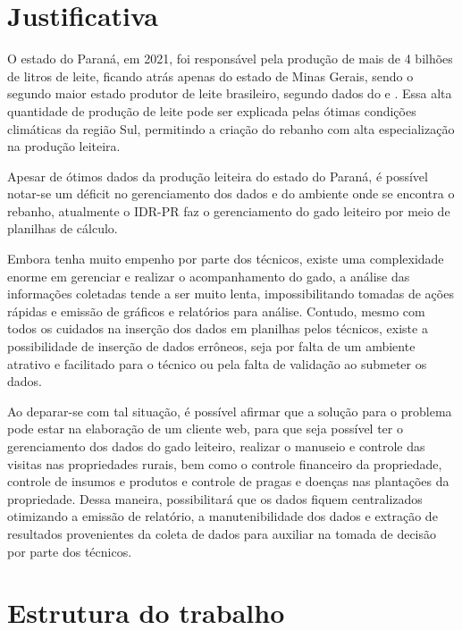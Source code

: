 \section{Justificativa}\label{sec:justificativa}

O estado do Paraná, em 2021, foi responsável pela produção de mais de 4 bilhões de litros de leite, ficando atrás apenas do estado de Minas Gerais, sendo o segundo maior estado produtor de leite brasileiro, segundo dados do  e . Essa alta quantidade de produção de leite pode ser explicada pelas ótimas condições climáticas da região Sul, permitindo a criação do rebanho com alta especialização na produção leiteira.

Apesar de ótimos dados da produção leiteira do estado do Paraná, é possível notar-se um déficit no gerenciamento dos dados e do ambiente onde se encontra o rebanho, atualmente o \gls{IDR-PR} faz o gerenciamento do gado leiteiro por meio de planilhas de cálculo.

Embora tenha muito empenho por parte dos técnicos, existe uma complexidade enorme em gerenciar e realizar o acompanhamento do gado, a análise das informações coletadas tende a ser muito lenta, impossibilitando tomadas de ações rápidas e emissão de gráficos e relatórios para análise. Contudo, mesmo com todos os cuidados na inserção dos dados em planilhas pelos técnicos, existe a possibilidade de inserção de dados errôneos, seja por falta de um ambiente atrativo e facilitado para o técnico ou pela falta de validação ao submeter os dados.

Ao deparar-se com tal situação, é possível afirmar que a solução para o problema pode estar na elaboração de um cliente web, para que seja possível ter o gerenciamento dos dados do gado leiteiro, realizar o manuseio e controle das visitas nas propriedades rurais, bem como o controle financeiro da propriedade, controle de insumos e produtos e controle de pragas e doenças nas plantações da propriedade. Dessa maneira, possibilitará que os dados fiquem centralizados otimizando a emissão de relatório, a manutenibilidade dos dados e extração de resultados provenientes da coleta de dados para auxiliar na tomada de decisão por parte dos técnicos.

\section{Estrutura do trabalho}\label{sec:estruturaTrabalho}

